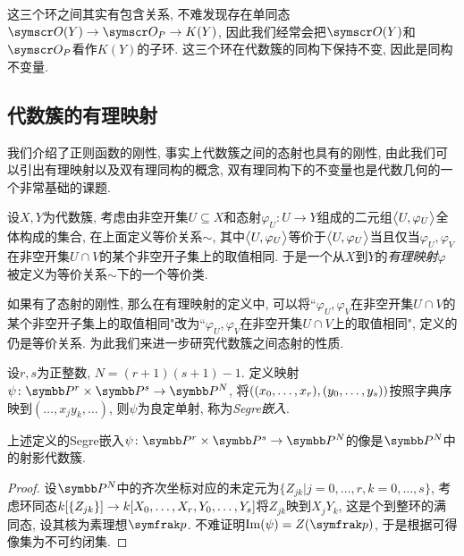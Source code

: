 这三个环之间其实有包含关系, 不难发现存在单同态$\OO (Y)\to \OO_P\to K(Y)$, 因此我们经常会把$\OO (Y)$和$\OO_P$看作$K(Y)$的子环. 这三个环在代数簇的同构下保持不变, 因此是同构不变量.

\subsection{代数簇的有理映射}

我们介绍了正则函数的刚性, 事实上代数簇之间的态射也具有的刚性, 由此我们可以引出有理映射以及双有理同构的概念, 双有理同构下的不变量也是代数几何的一个非常基础的课题.

设$X, Y$为代数簇, 考虑由非空开集$U\subseteq X$和态射$\varphi_U\colon U\to Y$组成的二元组$\lrbig<>{U, \varphi_U}$全体构成的集合, 在上面定义等价关系$\sim$, 其中$\lrbig<>{U, \varphi_U}$等价于$\lrbig<>{U, \varphi_U}$当且仅当$\varphi_U, \varphi_V$在非空开集$U\cap V$的某个非空开子集上的取值相同. 于是一个从$X$到$Y$的\emph{有理映射}$\varphi$被定义为等价关系$\sim$下的一个等价类.

如果有了态射的刚性, 那么在有理映射的定义中, 可以将``$\varphi_U, \varphi_V$在非空开集$U\cap V$的某个非空开子集上的取值相同"改为``$\varphi_U, \varphi_V$在非空开集$U\cap V$上的取值相同", 定义的仍是等价关系. 为此我们来进一步研究代数簇之间态射的性质.

\begin{definition}
  设$r, s$为正整数, $N=(r+1)(s+1)-1$. 定义映射$\psi\colon \PP^r\times\PP^s\to\PP^N$, 将$((x_0, \dotsc, x_r), (y_0, \dotsc,\linebreak[0] y_s))$按照字典序映到$(\dotsc, x_jy_k, \dotsc)$, 则$\psi$为良定单射, 称为\emph{Segre嵌入}.
\end{definition}

\begin{proposition}\label{prop:segreembedding}
  上述定义的Segre嵌入$\psi\colon \PP^r\times\PP^s\to\PP^N$的像是$\PP^N$中的射影代数簇.
\end{proposition}

\begin{proof}
  设$\PP^N$中的齐次坐标对应的未定元为$\{Z_{jk}\vert j=0, \dotsc, r, k=0, \dotsc, s\}$, 考虑环同态$\kk [\{Z_{jk}\}]\to \kk [X_0, \dotsc, X_r, Y_0, \dotsc, Y_s]$将$Z_{jk}$映到$X_jY_k$, 这是个到整环的满同态, 设其核为素理想$\ideal{p}$. 不难证明$\Im (\psi)=Z(\ideal{p})$, 于是根据可得像集为不可约闭集.
\end{proof}

